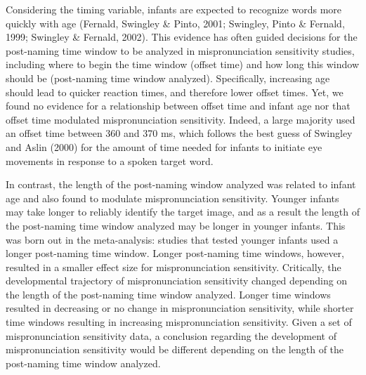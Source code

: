 \documentclass[man]{apa6}
\theoremstyle{definition}
\theoremstyle{definition}
\theoremstyle{definition}
\theoremstyle{remark}
\begin{document}
Considering the timing variable, infants are expected to recognize words
more quickly with age (Fernald, Swingley \& Pinto, 2001; Swingley, Pinto
\& Fernald, 1999; Swingley \& Fernald, 2002). This evidence has often
guided decisions for the post-naming time window to be analyzed in
mispronunciation sensitivity studies, including where to begin the time
window (offset time) and how long this window should be (post-naming
time window analyzed). Specifically, increasing age should lead to
quicker reaction times, and therefore lower offset times. Yet, we found
no evidence for a relationship between offset time and infant age nor
that offset time modulated mispronunciation sensitivity. Indeed, a large
majority used an offset time between 360 and 370 ms, which follows the
best guess of Swingley and Aslin (2000) for the amount of time needed
for infants to initiate eye movements in response to a spoken target
word.

In contrast, the length of the post-naming window analyzed was related
to infant age and also found to modulate mispronunciation sensitivity.
Younger infants may take longer to reliably identify the target image,
and as a result the length of the post-naming time window analyzed may
be longer in younger infants. This was born out in the meta-analysis:
studies that tested younger infants used a longer post-naming time
window. Longer post-naming time windows, however, resulted in a smaller
effect size for mispronunciation sensitivity. Critically, the
developmental trajectory of mispronunciation sensitivity changed
depending on the length of the post-naming time window analyzed. Longer
time windows resulted in decreasing or no change in mispronunciation
sensitivity, while shorter time windows resulting in increasing
mispronunciation sensitivity. Given a set of mispronunciation
sensitivity data, a conclusion regarding the development of
mispronunciation sensitivity would be different depending on the length
of the post-naming time window analyzed.
\end{document}

